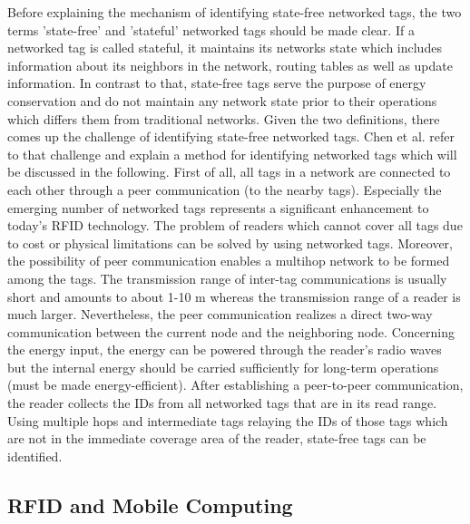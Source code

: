 Before explaining the mechanism of identifying state-free networked tags, the two terms 'state-free' and 'stateful' networked tags should be made clear. If a networked tag is called stateful, it maintains its networks state which includes information about its neighbors in the network, routing tables as well as update information. In contrast to that, state-free tags serve the purpose of energy conservation and do not maintain any network state prior to their operations which differs them from traditional networks. 
Given the two definitions, there comes up the challenge of identifying state-free networked tags. Chen et al. refer to that challenge and explain a method for identifying networked tags \cite[p.67 ff.]{chen} which will be discussed in the following. 
First of all, all tags in a network are connected to each other through a peer communication (to the nearby tags). Especially the emerging number of networked tags represents a significant enhancement to today's RFID technology. The problem of readers which cannot cover all tags due to cost or physical limitations can be solved by using networked tags. Moreover, the possibility of peer communication enables a multihop network to be formed among the tags. The transmission range of inter-tag communications is usually short and amounts to about 1-10 m whereas the transmission range of a reader is much larger. 
Nevertheless, the peer communication realizes a direct two-way communication between the current node and the neighboring node. Concerning the energy input, the energy can be powered through the reader's radio waves but the internal energy should be carried sufficiently for long-term operations (must be made energy-efficient).
After establishing a peer-to-peer communication, the reader collects the IDs from all networked tags that are in its read range. Using multiple hops and intermediate tags relaying the IDs of those tags which are not in the immediate coverage area of the reader, state-free tags can be identified. 

\subsection{RFID and Mobile Computing}

